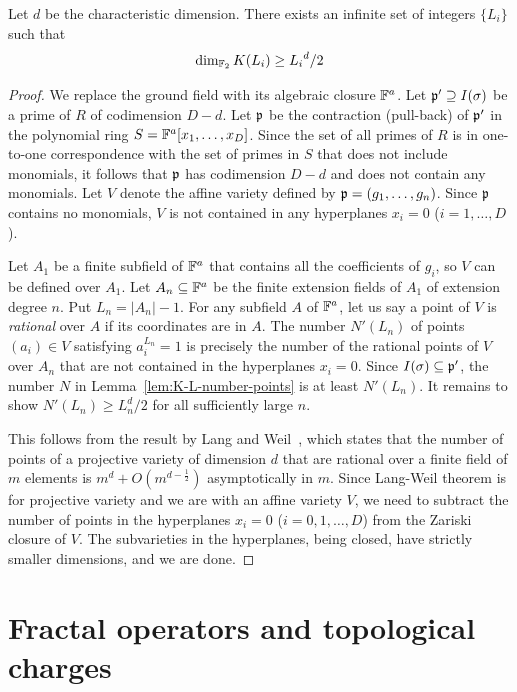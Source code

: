 \begin{lem}
Let $d$ be the characteristic dimension.
There exists an infinite set of integers $\{ L_i \}$ such that
\[
 \dim_{\mathbb{F}_2} K(L_i) \ge {L_i}^d /2
\]
\label{lem:k-growing-sequence-L}
\end{lem}
\begin{proof}
We replace the ground field with its algebraic closure $\mathbb{F}^a$.
Let $\mathfrak{p}' \supseteq I(\sigma)$ be a prime of $R$ of codimension $D-d$.
Let $\mathfrak{p}$ be the contraction (pull-back) of $\mathfrak{p}'$ in the polynomial ring
$S = \mathbb{F}^a[x_1,\ldots,x_D]$. Since the set of all primes of $R$ is in one-to-one
correspondence with the set of primes in $S$ that does not include monomials,
it follows that $\mathfrak{p}$ has codimension $D-d$ and does not contain any monomials.
Let $V$ denote the affine variety defined by $\mathfrak{p}=(g_1,\ldots,g_n)$.
Since $\mathfrak{p}$ contains no monomials, $V$ is not contained in any hyperplanes $x_i = 0$
($i = 1,\ldots, D$).

Let $A_1$ be a finite subfield of $\mathbb{F}^a$ that contains all the coefficients of $g_i$,
so $V$ can be defined over $A_1$.
Let $A_n \subseteq \mathbb{F}^a$ be the finite extension fields of $A_1$ of extension degree $n$.
Put $L_n = |A_n|-1$.
For any subfield $A$ of $\mathbb{F}^a$, let us say a point of $V$ is \emph{rational} over $A$
if its coordinates are in $A$.
The number $N'(L_n)$ of points $(a_i) \in V$ satisfying $a_i^{L_n} = 1$
is precisely the number of the rational points of $V$ over $A_n$
that are not contained in the hyperplanes $x_i=0$.
Since $I(\sigma) \subseteq \mathfrak{p}'$,
the number $N$ in Lemma~\ref{lem:K-L-number-points} is at least $N'(L_n)$.
It remains to show $N'(L_n) \ge L_n^d /2$ for all sufficiently large $n$.

This follows from the result by Lang and Weil~\cite{LangWeil1954},
which states that the number of points of a projective variety
of dimension $d$ that are rational over a finite field of $m$ elements
is $m^d + O\left(m^{d-\frac{1}{2}} \right)$ asymptotically in $m$.
Since Lang-Weil theorem is for projective variety
and we are with an affine variety $V$,
we need to subtract the number of points in the hyperplanes $x_i = 0$
($i = 0,1,\ldots,D$)
from the Zariski closure of $V$.
The subvarieties in the hyperplanes, being closed,
have strictly smaller dimensions, and we are done.
\end{proof}


\section{Fractal operators and topological charges}
\label{sec:fractal-operators}

